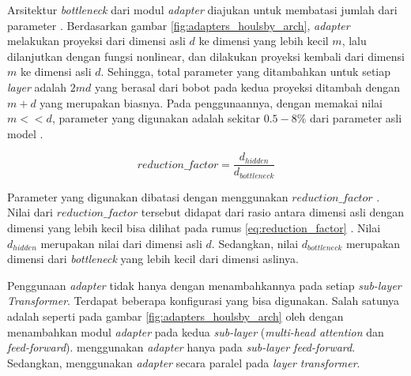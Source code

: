 Arsitektur \textit{bottleneck} dari modul \textit{adapter} diajukan untuk membatasi jumlah dari parameter \parencite{adapter_houlsby}. Berdasarkan gambar \ref{fig:adapters_houlsby_arch}, \textit{adapter} melakukan proyeksi dari dimensi asli $d$ ke dimensi yang lebih kecil $m$, lalu dilanjutkan dengan fungsi nonlinear, dan dilakukan proyeksi kembali dari dimensi $m$ ke dimensi asli $d$. Sehingga, total parameter yang ditambahkan untuk setiap \textit{layer} adalah $2md$ yang berasal dari bobot pada kedua proyeksi ditambah dengan $m+d$ yang merupakan biasnya. Pada penggunaannya, dengan memakai nilai $m << d$, parameter yang digunakan adalah sekitar $0.5-8\%$ dari parameter asli model \parencite{adapter_houlsby}.

\begin{equation}
    reduction\_factor = \frac{d_{hidden}}{d_{bottleneck}}
    \label{eq:reduction_factor}
\end{equation}

Parameter yang digunakan dibatasi dengan menggunakan $reduction\_factor$ \parencite{adapterhub}. Nilai dari $reduction\_factor$ tersebut didapat dari rasio antara dimensi asli dengan dimensi yang lebih kecil bisa dilihat pada rumus \ref{eq:reduction_factor} \parencite{adapterhub}. Nilai $d_{hidden}$ merupakan nilai dari dimensi asli $d$. Sedangkan, nilai $d_{bottleneck}$ merupakan dimensi dari \textit{bottleneck} yang lebih kecil dari dimensi aslinya.

Penggunaan \textit{adapter} tidak hanya dengan menambahkannya pada setiap \textit{sub-layer Transformer}. Terdapat beberapa konfigurasi yang bisa digunakan. Salah satunya adalah seperti pada gambar \ref{fig:adapters_houlsby_arch} oleh \parencite{adapter_houlsby} dengan menambahkan modul \textit{adapter} pada kedua \textit{sub-layer} (\textit{multi-head attention} dan \textit{feed-forward}). \citeauthor{adapter_pfeiffer} menggunakan \textit{adapter} hanya pada \textit{sub-layer feed-forward}. Sedangkan, \citeauthor{uvpl} menggunakan \textit{adapter} secara paralel pada \textit{layer transformer}.

